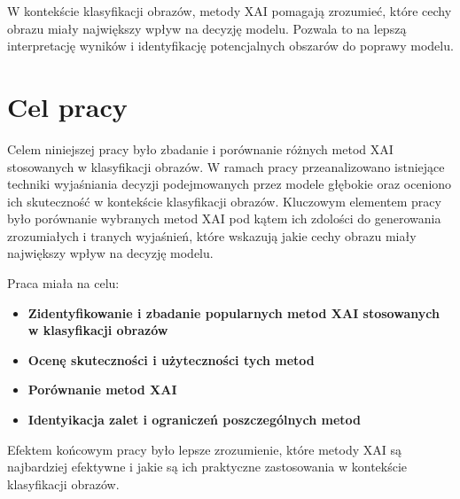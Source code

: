 W kontekście klasyfikacji obrazów, metody XAI pomagają zrozumieć, które cechy obrazu miały największy wpływ na decyzję modelu.
Pozwala to na lepszą interpretację wyników i identyfikację potencjalnych obszarów do poprawy modelu.

\section*{Cel pracy}
Celem niniejszej pracy było zbadanie i porównanie różnych metod XAI stosowanych w klasyfikacji obrazów.
W ramach pracy przeanalizowano istniejące techniki wyjaśniania decyzji podejmowanych przez modele głębokie oraz oceniono ich skuteczność w kontekście klasyfikacji obrazów.
Kluczowym elementem pracy było porównanie wybranych metod XAI pod kątem ich zdolości do generowania zrozumiałych i tranych wyjaśnień, które wskazują jakie cechy obrazu miały największy wpływ na decyzję modelu.

Praca miała na celu:
\begin{itemize}
  \item \textbf{Zidentyfikowanie i zbadanie popularnych metod XAI stosowanych w klasyfikacji obrazów}
  \item \textbf{Ocenę skuteczności i użyteczności tych metod}
  \item \textbf{Porównanie metod XAI}
  \item \textbf{Identyikacja zalet i ograniczeń poszczególnych metod}
\end{itemize}

Efektem końcowym pracy było lepsze zrozumienie, które metody XAI są najbardziej efektywne i jakie są ich praktyczne zastosowania w kontekście klasyfikacji obrazów.

